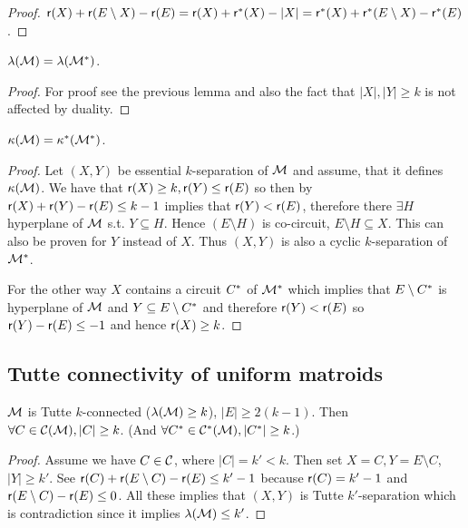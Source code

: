 \begin{proof}
	$\operatorname{\mathsf{r}}(X) + \operatorname{\mathsf{r}}(E \setminus X) - \operatorname{\mathsf{r}}(E) = \operatorname{\mathsf{r}}(X) + \operatorname{\mathsf{r}}^{\ast}(X) - |X| = \operatorname{\mathsf{r}}^{\ast}(X) + \operatorname{\mathsf{r}}^{\ast}(E \setminus X) - \operatorname{\mathsf{r}}^{\ast}(E)$.
\end{proof}

\begin{prop}
	$\lambda(\mathcal{M}) = \lambda(\mathcal{M}^{\ast})$.
\end{prop}

\begin{proof}
	For proof see the previous lemma and also the fact that $|X|, |Y| \geq k$ is not affected by duality.
\end{proof}

\begin{prop}
	$\kappa (\mathcal{M}) = \kappa^{\ast}(\mathcal{M}^{\ast})$.
\end{prop}

\begin{proof}
	Let $(X,Y)$ be essential $k$-separation of $\mathcal{M}$ and assume, that it defines $\kappa(\mathcal{M})$. We have that $\operatorname{\mathsf{r}}(X) \geq k, \operatorname{\mathsf{r}}(Y) \leq \operatorname{\mathsf{r}}(E)$ so then by $\operatorname{\mathsf{r}}(X) + \operatorname{\mathsf{r}}(Y) - \operatorname{\mathsf{r}}(E) \leq k-1$ implies that $\operatorname{\mathsf{r}}(Y) < \operatorname{\mathsf{r}}(E)$, therefore there $\exists H$ hyperplane of $\mathcal{M}$ s.t. $Y \subseteq H$. Hence $(E \setminus H)$ is co-circuit, $E \setminus H \subseteq X$. This can also be proven for $Y$ instead of $X$. Thus $(X,Y)$ is also a cyclic $k$-separation of $\mathcal{M}^{\ast}$.

	For the other way $X$ contains a circuit $C^{\ast}$ of $\mathcal{M}^{\ast}$ which implies that $E \setminus C^{\ast}$ is hyperplane of $\mathcal{M}$ and $Y \subseteq E \setminus C^{\ast}$ and therefore $\operatorname{\mathsf{r}}(Y) < \operatorname{\mathsf{r}}(E)$ so $\operatorname{\mathsf{r}}(Y) - \operatorname{\mathsf{r}}(E) \leq -1$ and hence $\operatorname{\mathsf{r}}(X) \geq k$.
\end{proof}

\subsection{Tutte connectivity of uniform matroids}

\begin{lemma}
	$\mathcal{M}$ is Tutte $k$-connected ($\lambda(\mathcal{M}) \geq k$), $|E| \geq 2 (k-1)$. Then $\forall C \in \mathcal{C}(\mathcal{M}), |C| \geq k$. (And $\forall C^{\ast} \in \mathcal{C}^{\ast}(\mathcal{M}), |C^{\ast}| \geq k$.)
\end{lemma}

\begin{proof}
	Assume we have $C \in \mathcal{C}$, where $|C| = k' < k$. Then set $X = C, Y = E \setminus C$, $|Y| \geq k'$. See $\operatorname{\mathsf{r}}(C) + \operatorname{\mathsf{r}}(E \setminus C) - \operatorname{\mathsf{r}}(E) \leq k'-1$ because $\operatorname{\mathsf{r}}(C) = k' -1$ and $\operatorname{\mathsf{r}}(E \setminus C) - \operatorname{\mathsf{r}}(E) \leq 0$. All these implies that $(X,Y)$ is Tutte $k'$-separation which is contradiction since it implies $\lambda(\mathcal{M}) \leq k'$.
\end{proof}

